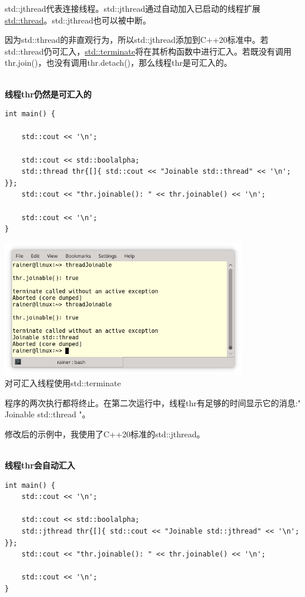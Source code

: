 
std::jthread代表连接线程。std::jthread通过自动加入已启动的线程扩展\href{https://en.cppreference.com/w/cpp/thread/thread}{std::thread}。std::jthread也可以被中断。

因为std::thread的非直观行为，所以std::jthread添加到C++20标准中。若std::thread仍可汇入，\href{https://en.cppreference.com/w/cpp/error/terminate}{std::terminate}将在其析构函数中进行汇入。若既没有调用thr.join()，也没有调用thr.detach()，那么线程thr是可汇入的。

\hspace*{\fill} \\ %
\noindent
\textbf{线程thr仍然是可汇入的}
\begin{lstlisting}[style=styleCXX]
int main() {
	
	std::cout << '\n';
	
	std::cout << std::boolalpha;
	std::thread thr{[]{ std::cout << "Joinable std::thread" << '\n'; }};
	std::cout << "thr.joinable(): " << thr.joinable() << '\n';
	
	std::cout << '\n';
}
\end{lstlisting}

\begin{center}
\includegraphics[width=0.8\textwidth]{content/2/chapter3/images/9.png}\\
对可汇入线程使用std::terminate
\end{center}

程序的两次执行都将终止。在第二次运行中，线程thr有足够的时间显示它的消息:" Joinable std::thread "。

修改后的示例中，我使用了C++20标准的std::jthread。

\hspace*{\fill} \\ %
\noindent
\textbf{线程thr会自动汇入}
\begin{lstlisting}[style=styleCXX]
int main() {
	std::cout << '\n';
	
	std::cout << std::boolalpha;
	std::jthread thr{[]{ std::cout << "Joinable std::jthread" << '\n'; }};
	std::cout << "thr.joinable(): " << thr.joinable() << '\n';
	
	std::cout << '\n';
}
\end{lstlisting}

